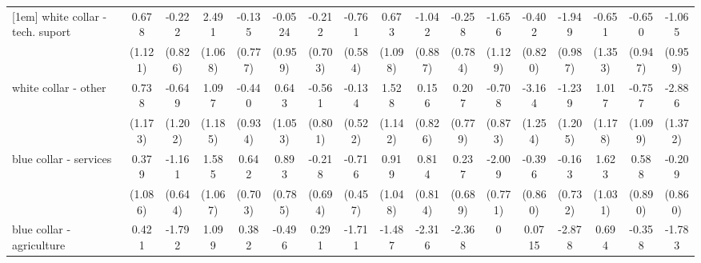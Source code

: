 {\begin{tabular}{l*{16}{c}}
[1em]
white collar - tech. suport&       0.678         &      -0.222         &       2.491\sym{*}  &      -0.135         &     -0.0524         &      -0.212         &      -0.761         &       0.673         &      -1.042         &      -0.258         &      -1.656         &      -0.402         &      -1.949\sym{*}  &      -0.651         &      -0.650         &      -1.065         \\
                    &     (1.121)         &     (0.826)         &     (1.068)         &     (0.777)         &     (0.959)         &     (0.703)         &     (0.584)         &     (1.098)         &     (0.887)         &     (0.784)         &     (1.129)         &     (0.820)         &     (0.987)         &     (1.353)         &     (0.947)         &     (0.959)         \\
[1em]
white collar - other&       0.738         &      -0.649         &       1.097         &      -0.440         &       0.643         &      -0.561         &      -0.134         &       1.528         &       0.156         &       0.207         &      -0.708         &      -3.164\sym{*}  &      -1.239         &       1.017         &      -0.757         &      -2.886\sym{*}  \\
                    &     (1.173)         &     (1.202)         &     (1.185)         &     (0.934)         &     (1.053)         &     (0.801)         &     (0.522)         &     (1.142)         &     (0.826)         &     (0.779)         &     (0.873)         &     (1.254)         &     (1.205)         &     (1.178)         &     (1.099)         &     (1.372)         \\
[1em]
blue collar - services&       0.379         &      -1.161         &       1.585         &       0.642         &       0.893         &      -0.218         &      -0.716         &       0.919         &       0.814         &       0.237         &      -2.009\sym{**} &      -0.396         &      -0.163         &       1.623         &       0.588         &      -0.209         \\
                    &     (1.086)         &     (0.644)         &     (1.067)         &     (0.703)         &     (0.785)         &     (0.694)         &     (0.457)         &     (1.048)         &     (0.814)         &     (0.689)         &     (0.771)         &     (0.860)         &     (0.732)         &     (1.031)         &     (0.890)         &     (0.860)         \\
[1em]
blue collar - agriculture&       0.421         &      -1.792         &       1.099         &       0.382         &      -0.496         &       0.291         &      -1.711\sym{*}  &      -1.487         &      -2.316         &      -2.368\sym{*}  &           0         &      0.0715         &      -2.878\sym{*}  &       0.694         &      -0.358         &      -1.783         \\

\end{tabular}}
